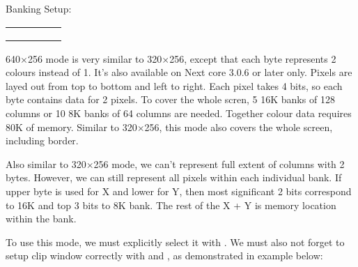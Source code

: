 \begin{multicols}{2}
    Banking Setup:

    \begin{tabularx}{0.395\textwidth}{|c|c|c|c|Y|}
        \hline
         & 
             & 
             &
             &
             \\
        \hline
         & 
             \\
        \hline
         &
             &
             \\
        \hline
         &
             &
             \\
        \hline
    \end{tabularx}
\end{multicols}

640$\times$256 mode is very similar to 320$\times$256, except that each byte represents 2 colours instead of 1. It's also available on Next core 3.0.6 or later only. Pixels are layed out from top to bottom and left to right. Each pixel takes 4 bits, so each byte contains data for 2 pixels. To cover the whole scren, 5 16K banks of 128 columns or 10 8K banks of 64 columns are needed. Together colour data requires 80K of memory. Similar to 320$\times$256, this mode also covers the whole screen, including border.

Also similar to 320$\times$256 mode, we can't represent full extent of columns with 2 bytes. However, we can still represent all pixels within each individual bank. If upper byte is used for X and lower for Y, then most significant 2 bits correspond to 16K and top 3 bits to 8K bank. The rest of the X + Y is memory location within the bank.

To use this mode, we must explicitly select it with . We must also not forget to setup clip window correctly with  and , as demonstrated in example below:

